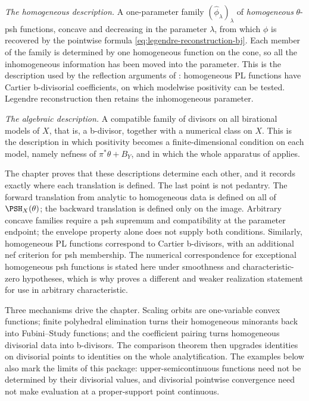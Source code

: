 \emph{The homogeneous description.}  A one-parameter family
$(\widehat\phi_\lambda)_\lambda$ of \emph{homogeneous} $\theta$-psh
functions, concave and decreasing in the parameter $\lambda$, from which
$\phi$ is recovered by the pointwise formula
\eqref{eq:legendre-reconstruction-bj}.  Each member of the family is
determined by one homogeneous function on the cone, so all the
inhomogeneous information has been moved into the parameter.  This is the
description used by the reflection arguments of
: homogeneous PL functions have Cartier
b-divisorial coefficients, on which modelwise positivity can be tested.
Legendre reconstruction then retains the inhomogeneous parameter.

\emph{The algebraic description.}  A compatible family of divisors on all
birational models of $X$, that is, a b-divisor, together with a numerical
class on $X$.  This is the description in which positivity becomes a
finite-dimensional condition on each model, namely nefness of
$\pi^*\theta+B_Y$, and in which the whole apparatus of
 applies.

The chapter proves that these descriptions determine each other, and it
records exactly where each translation is defined.  The last point is not
pedantry.  The forward translation from analytic to homogeneous data is
defined on all of $\PSH_X(\theta)$; the backward translation is defined
only on the image. Arbitrary concave families require a psh supremum and
compatibility at the parameter endpoint; the envelope property alone does
not supply both conditions. Similarly, homogeneous PL functions correspond
to Cartier b-divisors, with an additional nef criterion for psh membership.
The numerical correspondence for exceptional homogeneous psh functions is
stated here under smoothness and characteristic-zero hypotheses, which is why
 proves a different and weaker
realization statement for use in arbitrary characteristic.

Three mechanisms drive the chapter.  Scaling orbits are one-variable
convex functions; finite polyhedral elimination turns their homogeneous
minorants back into Fubini--Study functions; and the coefficient pairing
turns homogeneous divisorial data into b-divisors.  The comparison theorem
then upgrades identities on divisorial points to identities on the whole
analytification.  The examples below also mark the limits of this package:
upper-semicontinuous functions need not be determined by their divisorial
values, and divisorial pointwise convergence need not make evaluation at a
proper-support point continuous.

